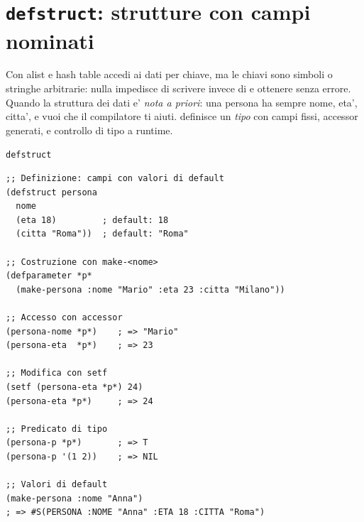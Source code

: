 \section{\texttt{defstruct}: strutture con campi nominati}

Con alist e hash table accedi ai dati per chiave, ma le chiavi
sono simboli o stringhe arbitrarie: nulla impedisce di scrivere
 invece di  e ottenere  senza errore.
Quando la struttura dei dati e' \emph{nota a priori}: una persona
ha sempre nome, eta', citta', e vuoi che il compilatore ti aiuti.
 definisce un \emph{tipo} con campi fissi, accessor
generati, e controllo di tipo a runtime.

\begin{concetto}{\texttt{defstruct}}

\boxsep
{}
\end{concetto}

\begin{esempio}
\begin{lstlisting}
;; Definizione: campi con valori di default
(defstruct persona
  nome
  (eta 18)         ; default: 18
  (citta "Roma"))  ; default: "Roma"

;; Costruzione con make-<nome>
(defparameter *p*
  (make-persona :nome "Mario" :eta 23 :citta "Milano"))

;; Accesso con accessor
(persona-nome *p*)    ; => "Mario"
(persona-eta  *p*)    ; => 23

;; Modifica con setf
(setf (persona-eta *p*) 24)
(persona-eta *p*)     ; => 24

;; Predicato di tipo
(persona-p *p*)       ; => T
(persona-p '(1 2))    ; => NIL

;; Valori di default
(make-persona :nome "Anna")
; => #S(PERSONA :NOME "Anna" :ETA 18 :CITTA "Roma")
\end{lstlisting}
\end{esempio}

